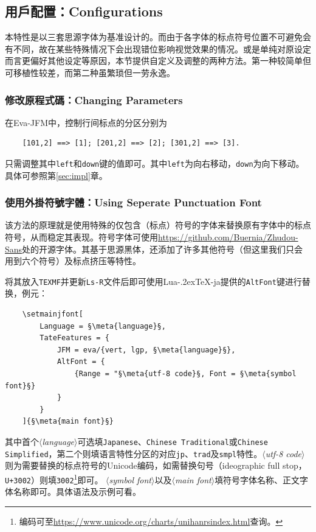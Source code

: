 \documentclass{ltjsarticle}
\def\meta#1{{\normalfont\rmfamily\itshape$\langle$#1\/$\rangle$}}
\def\段{\par}
\def\LuaTeX{Lua\kern-.2ex\TeX}
\begin{document}
\subsection{用戶配置：Configurations}\label{sec:config}
本特性是以三套思源字体为基准设计的。而由于各字体的标点符号位置不可避免会有不同，故在某些特殊情况下会出现错位影响视觉效果的情况。或是单纯对原设定而言更偏好其他设定等原因，本节提供自定义及调整的两种方法。第一种较简单但可移植性较差，而第二种虽繁琐但一劳永逸。

\subsubsection{修改原程式碼：Changing Parameters}
在\textsf{Eva-JFM}中，控制行间标点的分区分别为
\begin{lstlisting}
    [101,2] ==> [1]; [201,2] ==> [2]; [301,2] ==> [3].
\end{lstlisting}
只需调整其中\texttt{left}和\texttt{down}键的值即可。其中\texttt{left}为向右移动，\texttt{down}为向下移动。
具体可参照第\ref{sec:impl}章。

\subsubsection{使用外掛符號字體：Using Seperate Punctuation Font}
该方法的原理就是使用特殊的仅包含（标点）符号的字体来替换原有字体中的标点符号，从而稳定其表现。符号字体可使用\url{https://github.com/Buernia/Zhudou-Sans}处的开源字体。其基于思源黑体，还添加了许多其他符号（但这里我们只会用到六个符号）及标点挤压等特性。\段
将其放入\texttt{TEXMF}并更新\texttt{Ls-R}文件后即可使用\LuaTeX-ja提供的\texttt{AltFont}键进行替换，例元：
\begin{lstlisting}
    \setmainjfont[
        Language = §\meta{language}§,
        TateFeatures = {
            JFM = eva/{vert, lgp, §\meta{language}§},
            AltFont = {
                {Range = "§\meta{utf-8 code}§, Font = §\meta{symbol font}§}
            }
        }
    ]{§\meta{main font}§}
\end{lstlisting}
其中首个\meta{language}可选填\texttt{Japanese}、\texttt{Chinese Traditional}或\texttt{Chinese Simplified}，第二个则填语言特性分区的对应\texttt{jp}、\texttt{trad}及\texttt{smpl}特性。\meta{utf-8 code}则为需要替换的标点符号的Unicode编码，如需替换句号（ideographic full stop，\texttt{U+3002}）则填\texttt{3002}\footnote{编码可至\url{https://www.unicode.org/charts/unihanrsindex.html}查询。}即可。
\meta{symbol font}以及\meta{main font}填符号字体名称、正文字体名称即可。具体语法及示例可看\cite{luatexja-doc}。
\end{document}
